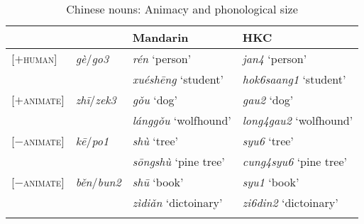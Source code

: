 \documentclass[output=paper]{langsci/langscibook}
\begin{document}
\begin{table}
\caption{Chinese nouns: Animacy and phonological size\label{tab:23.2}}
\begin{tabularx}{\textwidth}{llQQ}
\lsptoprule
                          & \Clf{}                 & Mandarin               & \gls{HKC}        \\
\midrule
{}[$+$\textsc{human}]       & \emph{gè}/\emph{go3}   & \emph{rén} \enquote*{person}        & \emph{jan4} \enquote*{person}            \\
		                  &                        & \emph{xuéshēng} \enquote*{student}  & \emph{hok6saang1} \enquote*{student}     \\
{}[$+$\textsc{animate}]     & \emph{zhī}/\emph{zek3} & \emph{gǒu} \enquote*{dog}           & \emph{gau2} \enquote*{dog}               \\
		                  &                        & \emph{lánggǒu} \enquote*{wolfhound} & \emph{long4gau2} \enquote*{wolfhound}    \\
{}[$-$\textsc{animate}]     & \emph{kē}/\emph{po1}   & \emph{shù} \enquote*{tree}          & \emph{syu6} \enquote*{tree}              \\
		                  &                        & \emph{sōngshù} \enquote*{pine tree} & \emph{cung4syu6} \enquote*{pine tree}    \\
{}[$-$\textsc{animate}]     & \emph{běn}/\emph{bun2} & \emph{shū} \enquote*{book}          & \emph{syu1} \enquote*{book}              \\
		                  &                        & \emph{zìdiǎn} \enquote*{dictoinary} & \emph{zi6din2} \enquote*{dictoinary}     \\
\lspbottomrule
\end{tabularx}
\end{table}
\end{document}
